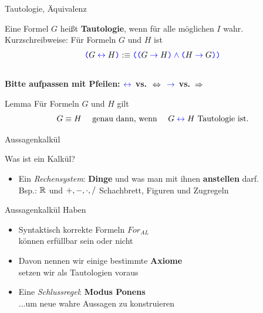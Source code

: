 \begin{frame}{Tautologie, Äquivalenz}
	\begin{Definition}
		Eine Formel $G$ heißt \textbf{Tautologie}, wenn für alle möglichen $I$ wahr. \\
		\pause
		\medskip
		Kurzschreibweise: Für Formeln $G$ und $H$ ist \\
		$$\textcolor{blue}{\texttt{(}}\text{} G \mathrel{\textcolor{blue}{\leftrightarrow}} H \textcolor{blue}{\texttt{)}}\text{} :\equiv \textcolor{blue}{\texttt{(}}\text{}\textcolor{blue}{\texttt{(}}\text{} G \mathrel{\textcolor{blue}{\to}} H \textcolor{blue}{\texttt{)}}\text{} \mathbin{\textcolor{blue}{\wedge}} \textcolor{blue}{\texttt{(}}\text{} H \mathrel{\textcolor{blue}{\to}} G\textcolor{blue}{\texttt{)}}\text{}\textcolor{blue}{\texttt{)}}\text{}$$ \\
		\medskip
		\alert{\textbf{Bitte aufpassen mit Pfeilen: \quad $\mathrel{\textcolor{blue}{\leftrightarrow}}$ vs. $\gdw$ \quad $\mathrel{\textcolor{blue}{\to}}$ vs. $\impl$}}
	\end{Definition}
	\pause
	\begin{block}{Lemma}
		Für Formeln $G$ und $H$ gilt \\
		\[ G \equiv H \quad \text{ genau dann, wenn } \quad G \mathrel{\textcolor{blue}{\leftrightarrow}} H \text{ Tautologie ist.} \]
	\end{block}
	\pause
	\begin{Beispiel}
	\end{Beispiel}
\end{frame}

\begin{frame}{Aussagenkalkül}
	\begin{block}{Was ist ein Kalkül?}
		\begin{itemize}
			\item Ein \emph{Rechensystem}: \; \textbf{Dinge} und was man mit ihnen \textbf{anstellen} darf. \\
			Bsp.: \quad $\mathbb{R}$ und $+, -, \cdot, /$ \qquad Schachbrett, Figuren und Zugregeln
		\end{itemize}
	\end{block}
	\pause
	\begin{block}{Aussagenkalkül}
		Haben
		\begin{itemize}
			\item Syntaktisch korrekte Formeln $For_{AL}$ \\
			\impl können erfüllbar sein oder nicht 
			\item Davon nennen wir einige bestimmte \textbf{Axiome} \\
			\impl setzen wir als Tautologien voraus
			\item Eine \emph{Schlussregel}: \textbf{Modus Ponens} \\
			...um neue wahre Aussagen zu konstruieren
		\end{itemize}
	\end{block}
\end{frame}

